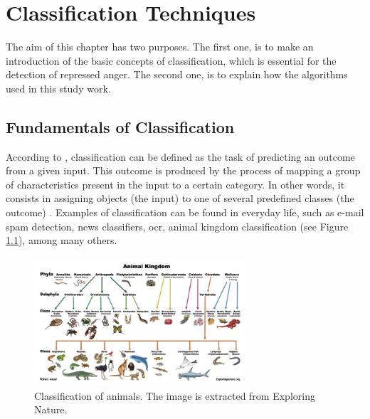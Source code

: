 
\chapter{Classification Techniques}
\label{ch:algorithms}

The aim of this chapter has two purposes. The first one, is to make an introduction of the basic concepts of classification, which is essential for the detection of repressed anger. The second one, is to explain how the algorithms used in this study work.

\section{Fundamentals of Classification}

According to \cite{voznika2007data}, classification can be defined as the task of predicting an outcome from a given input. This outcome is produced by the process of mapping a group of characteristics present in the input to a certain category. In other words, it consists in assigning objects (the input) to one of several predefined classes (the outcome) \cite{pang2006introduction}. Examples of classification can be found in everyday life, such as e-mail spam detection, news classifiers, \acrfull{ocr}, animal kingdom classification (see Figure \ref{fig:animal_classification}), among many others.

\begin{figure}[!htp]
  \center
  \includegraphics[width=0.7\textwidth]{figures/animal_classification}
  \caption{Classification of animals. The image is extracted from Exploring Nature.}
  \label{fig:animal_classification}
\end{figure}

\FloatBarrier

